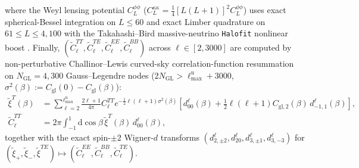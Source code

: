 \documentclass[11pt,a4paper]{article}
\begin{document}
where the Weyl lensing potential $C_L^{\phi\phi}$ ($C_L^{\kappa\kappa} = \frac{1}{4}[L(L+1)]^2 C_L^{\phi\phi}$) uses exact spherical-Bessel integration on $L \le 60$ and exact Limber quadrature on $61 \le L \le 4{,}100$ with the Takahashi--Bird massive-neutrino \texttt{Halofit} nonlinear boost \cite{Takahashi2012Halofit,Bird2012Halofit}. Finally, $(\tilde{C}_\ell^{TT}, \tilde{C}_\ell^{TE}, \tilde{C}_\ell^{EE}, \tilde{C}_\ell^{BB})$ across $\ell \in [2, 3000]$ are computed by non-perturbative Challinor--Lewis curved-sky correlation-function resummation \cite{ChallinorLewis2005} on $N_{\mathrm{GL}} = 4{,}300$ Gauss--Legendre nodes ($2N_{\mathrm{GL}} > \ell_{\max}^{\mathrm{u}} + 3000$, $\sigma^2(\beta) := C_{\mathrm{gl}}(0) - C_{\mathrm{gl}}(\beta)$):
\begin{equation}
\begin{aligned}
  \tilde{\xi}^T(\beta) &= \sum_{\ell=2}^{\ell_{\max}^{\mathrm{u}}}\frac{2\ell+1}{4\pi}C_\ell^{TT}e^{-\frac{1}{2}\ell(\ell+1)\sigma^2(\beta)}\!\left[d^\ell_{00}(\beta) + \frac{1}{2}\ell(\ell+1)C_{\mathrm{gl},2}(\beta)\,d^\ell_{-1,1}(\beta)\right], \\
  \tilde{C}_\ell^{TT} &= 2\pi\int_{-1}^1\!\mathrm{d}\cos\beta\,\tilde{\xi}^T(\beta)\,d^\ell_{00}(\beta),
\end{aligned}
\label{eq:challinor-lewis}
\end{equation}
together with the exact spin-$\pm 2$ Wigner-$d$ transforms $(d^\ell_{2,\pm 2}, d^\ell_{20}, d^\ell_{3,\pm 1}, d^\ell_{3,-3})$ for $(\tilde{\xi}_+, \tilde{\xi}_-, \tilde{\xi}^{TE}) \mapsto (\tilde{C}_\ell^{EE}, \tilde{C}_\ell^{BB}, \tilde{C}_\ell^{TE})$.
\end{document}
